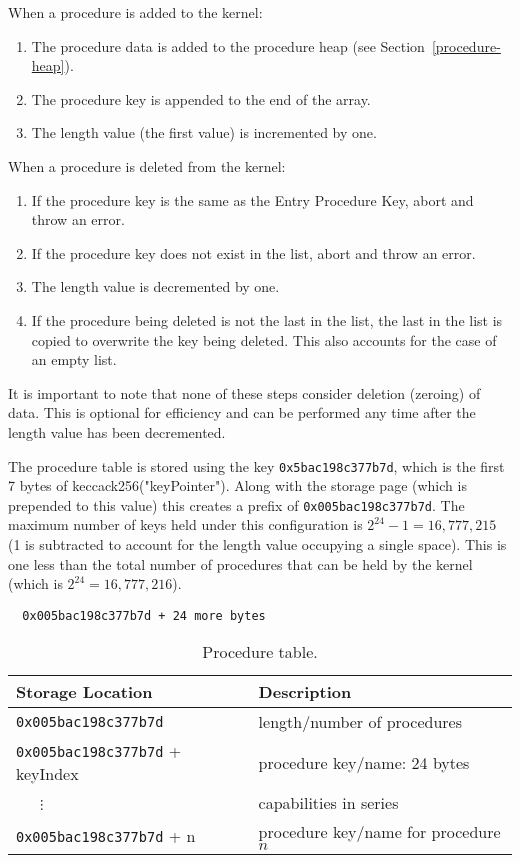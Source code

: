 \documentclass[english,a4paper]{article}
\begin{document}
When a procedure is added to the kernel:

\begin{enumerate}
  \item The procedure data is added to the procedure heap (see
  Section~\ref{procedure-heap}).
  \item The procedure key is appended to the end of the array.
  \item The length value (the first value) is incremented by one.
\end{enumerate}

When a procedure is deleted from the kernel:

\begin{enumerate}
  \item If the procedure key is the same as the Entry Procedure Key, abort and
  throw an error.
  \item If the procedure key does not exist in the list, abort and throw an
  error.
  \item The length value is decremented by one.
  \item If the procedure being deleted is not the last in the list, the last in
  the list is copied to overwrite the key being deleted. This also accounts for
  the case of an empty list.
\end{enumerate}

It is important to note that none of these steps consider deletion (zeroing) of
data. This is optional for efficiency and can be performed any time after the
length value has been decremented.

The procedure table is stored using the key \texttt{0x5bac198c377b7d}, which is
the first 7 bytes of keccack256("keyPointer"). Along with the storage page
(which is prepended to this value) this creates a prefix of
\texttt{0x005bac198c377b7d}. The maximum number of keys held under this
configuration is $2^{24} - 1 = 16,777,215$ (1 is subtracted to account for the
length value occupying a single space). This is one less than the total number
of procedures that can be held by the kernel (which is $2^{24} = 16,777,216$).

\begin{verbatim}
  0x005bac198c377b7d + 24 more bytes
\end{verbatim}

\begin{table}[H]
  \caption{Procedure table.}
  \centering{}%
  \begin{tabular}{l|p{}}
    \hline
    Storage Location & Description\tabularnewline
    \hline
    \hline
    \texttt{0x005bac198c377b7d}     & length/number of procedures
      \tabularnewline
    \texttt{0x005bac198c377b7d} + keyIndex & procedure key/name: 24 bytes
      \tabularnewline
    ~~~$\vdots$ & capabilities in series \tabularnewline
    \texttt{0x005bac198c377b7d} + n & procedure key/name for procedure $n$
      \tabularnewline
    \hline
  \end{tabular}
\end{table}
\end{document}

